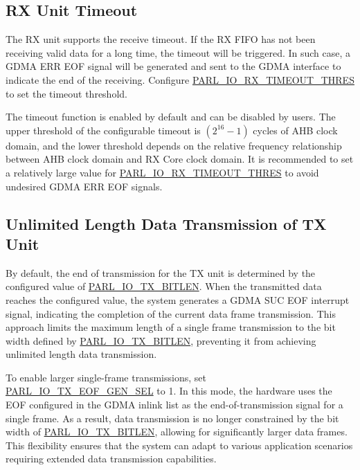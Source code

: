 \documentclass[main\_\_EN.tex]{subfiles}
\begin{document}
\subsection{RX Unit Timeout}
The RX unit supports the receive timeout. If the RX FIFO has not been receiving valid data for a long time, the timeout will be triggered. In such case, a GDMA ERR EOF signal will be generated and sent to the GDMA interface to indicate the end of the receiving. Configure \hyperref[fielddesc:PARLIORXTIMEOUTTHRES]{PARL\_IO\_RX\_TIMEOUT\_THRES} to set the timeout threshold.

The timeout function is enabled by default and can be disabled by users. The upper threshold of the configurable timeout is \begin{math} (2^{16}-1) \end{math} cycles of AHB clock domain, and the lower threshold depends on the relative frequency relationship between AHB clock domain and RX Core clock domain. It is recommended to set a relatively large value for \hyperref[fielddesc:PARLIORXTIMEOUTTHRES]{PARL\_IO\_RX\_TIMEOUT\_THRES} to avoid undesired GDMA ERR EOF signals.

\subsection{Unlimited Length Data Transmission of TX Unit}

By default, the end of transmission for the TX unit is determined by the configured value of \hyperref[fielddesc:PARLIOTXBITLEN]{PARL\_IO\_TX\_BITLEN}. When the transmitted data reaches the configured value, the system generates a GDMA SUC EOF interrupt signal, indicating the completion of the current data frame transmission. This approach limits the maximum length of a single frame transmission to the bit width defined by \hyperref[fielddesc:PARLIOTXBITLEN]{PARL\_IO\_TX\_BITLEN}, preventing it from achieving unlimited length data transmission.

To enable larger single-frame transmissions, set \hyperref[fielddesc:PARLIOTXEOFGENSEL]{PARL\_IO\_TX\_EOF\_GEN\_SEL} to 1. In this mode, the hardware uses the EOF configured in the GDMA inlink list as the end-of-transmission signal for a single frame. As a result, data transmission is no longer constrained by the bit width of \hyperref[fielddesc:PARLIOTXBITLEN]{PARL\_IO\_TX\_BITLEN}, allowing for significantly larger data frames. This flexibility ensures that the system can adapt to various application scenarios requiring extended data transmission capabilities.
\end{document}
